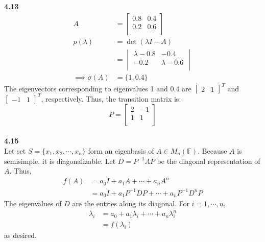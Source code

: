 \documentclass[letterpaper,12pt]{article}
\theoremstyle{definition}
\begin{document}
\noindent\textbf{4.13}\\
\begin{align*}
A&=\begin{bmatrix}
	0.8 & 0.4\\
	0.2 & 0.6 \\
\end{bmatrix}\\
p(\lambda) &= \det(\lambda I - A)\\
&= \begin{vmatrix}
	\lambda - 0.8 & -0.4\\
	-0.2 & \lambda - 0.6 \\
\end{vmatrix}\\
\implies \sigma(A) &= \{1, 0.4\}
\end{align*}
The eigenvectors corresponding to eigenvalues 1 and 0.4 are $\begin{bmatrix}2 &1\end{bmatrix}^T$ and $\begin{bmatrix}-1& 1\end{bmatrix}^T$, respectively. Thus, the transition matrix is:
\begin{equation*}
P=\begin{bmatrix}
	2 & -1\\
	1 & 1\\
\end{bmatrix}
\end{equation*}\\

\noindent\textbf{4.15}\\
Let set $S = \{x_1, x_2, \cdots , x_n\}$ form an eigenbasis of $A \in M_n(\mathbb{F})$. Because $A$ is semisimple, it is diagonalizable. Let $D = P^{-1}AP$ be the diagonal representation of $A$. Thus,
\begin{align*}
f(A) &= a_0I + a_1A + \cdots + a_nA^n \\
&= a_0I + a_1P^{-1}DP + \cdots + a_n P^{-1}D^nP
\end{align*}
The eigenvalues of $D$ are the entries along its diagonal. For $i = 1, \cdots , n$,
\begin{align*}
\lambda_i &= a_0 + a_1 \lambda_i + \cdots + a_n \lambda_i^n\\
&= f(\lambda_i)
\end{align*}
as desired.\\
\end{document}
